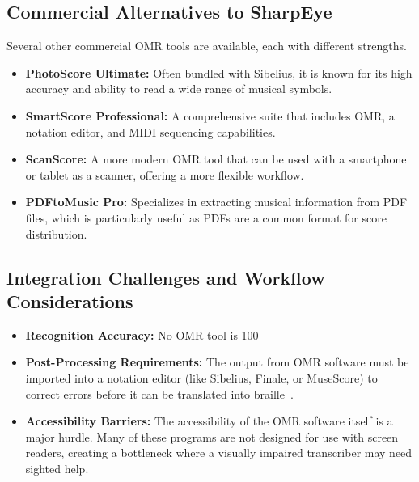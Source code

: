 \subsection{Commercial Alternatives to SharpEye}\label{ch10:ssec:commercial-alternatives}
Several other commercial \gls{OMR} tools are available, each with different strengths.
\begin{itemize}
	\item \textbf{PhotoScore Ultimate:} Often bundled with Sibelius, it is known for its high accuracy and ability to read a wide range of musical symbols.
	\item \textbf{SmartScore Professional:} A comprehensive suite that includes \gls{OMR}, a notation editor, and MIDI sequencing capabilities.
	\item \textbf{ScanScore:} A more modern \gls{OMR} tool that can be used with a smartphone or tablet as a scanner, offering a more flexible workflow.
	\item \textbf{PDFtoMusic Pro:} Specializes in extracting musical information from PDF files, which is particularly useful as PDFs are a common format for score distribution.
\end{itemize}

\subsection{Integration Challenges and Workflow Considerations}\label{ch10:ssec:omr-integration-challenges}
\begin{itemize}
	\item \textbf{Recognition Accuracy:} No \gls{OMR} tool is 100%
	\item \textbf{Post-Processing Requirements:} The output from \gls{OMR} software must be imported into a notation editor (like Sibelius, Finale, or MuseScore) to correct errors before it can be translated into braille~\supercite{musescore-omr}.
	\item \textbf{Accessibility Barriers:} The accessibility of the \gls{OMR} software itself is a major hurdle. Many of these programs are not designed for use with screen readers, creating a bottleneck where a visually impaired transcriber may need sighted help.
\end{itemize}

